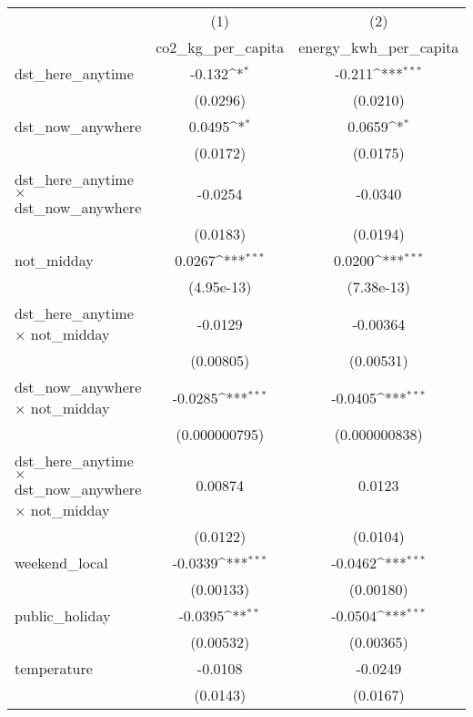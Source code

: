{
\def\sym#1{\ifmmode^{#1}\else\(^{#1}\)\fi}
\begin{tabular}{l*{2}{c}}
\hline\hline
                    &\multicolumn{1}{c}{(1)}&\multicolumn{1}{c}{(2)}\\
                    &\multicolumn{1}{c}{co2\_kg\_per\_capita}&\multicolumn{1}{c}{energy\_kwh\_per\_capita}\\
\hline
dst\_here\_anytime    &      -0.132\sym{*}  &      -0.211\sym{***}\\
                    &    (0.0296)         &    (0.0210)         \\
[1em]
dst\_now\_anywhere    &      0.0495\sym{*}  &      0.0659\sym{*}  \\
                    &    (0.0172)         &    (0.0175)         \\
[1em]
dst\_here\_anytime $\times$ dst\_now\_anywhere&     -0.0254         &     -0.0340         \\
                    &    (0.0183)         &    (0.0194)         \\
[1em]
not\_midday          &      0.0267\sym{***}&      0.0200\sym{***}\\
                    &  (4.95e-13)         &  (7.38e-13)         \\
[1em]
dst\_here\_anytime $\times$ not\_midday&     -0.0129         &    -0.00364         \\
                    &   (0.00805)         &   (0.00531)         \\
[1em]
dst\_now\_anywhere $\times$ not\_midday&     -0.0285\sym{***}&     -0.0405\sym{***}\\
                    &(0.000000795)         &(0.000000838)         \\
[1em]
dst\_here\_anytime $\times$ dst\_now\_anywhere $\times$ not\_midday&     0.00874         &      0.0123         \\
                    &    (0.0122)         &    (0.0104)         \\
[1em]
weekend\_local       &     -0.0339\sym{***}&     -0.0462\sym{***}\\
                    &   (0.00133)         &   (0.00180)         \\
[1em]
public\_holiday      &     -0.0395\sym{**} &     -0.0504\sym{***}\\
                    &   (0.00532)         &   (0.00365)         \\
[1em]
temperature         &     -0.0108         &     -0.0249         \\
                    &    (0.0143)         &    (0.0167)         \\

\end{tabular}}
